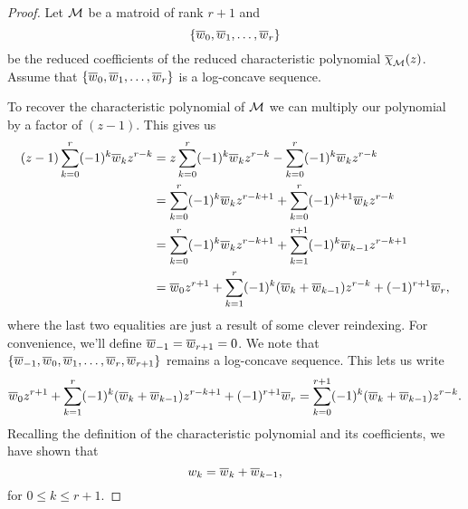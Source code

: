 \documentclass[12pt,oneside]{../../sfsuthesis}
\begin{document}
\begin{proof}

    Let \( \mathcal{M} \) be a matroid of rank \( r + 1 \) and
    \[
        \{\overline{w}_0, \overline{w}_1, \dots, \overline{w}_r \}
    \]
    be the reduced coefficients of the reduced characteristic polynomial \( \overline{\chi}_{\mathcal{M}}(z) \).
    Assume that \( \{\overline{w}_0, \overline{w}_1, \dots, \overline{w}_r \} \) is a log-concave sequence.

    To recover the characteristic polynomial of \( \mathcal{M} \) we can multiply our polynomial by a factor of \( (z-1) \).
    This gives us
    \begin{align*}
        (z - 1)\sum_{k=0}^r(-1)^k \overline{w}_k z^{r-k} & = z\sum_{k=0}^r(-1)^k \overline{w}_k z^{r-k} - \sum_{k=0}^r(-1)^k \overline{w}_k z^{r-k}              \\
                                                & = \sum_{k=0}^r(-1)^k \overline{w}_k z^{r-k+1} + \sum_{k=0}^r(-1)^{k+1} \overline{w}_k z^{r-k}         \\
                                                & = \sum_{k=0}^r(-1)^k \overline{w}_k z^{r-k+1} + \sum_{k=1}^{r+1}(-1)^{k} \overline{w}_{k-1} z^{r-k+1} \\
                                                & = \overline{w}_0 z^{r+1} + \sum_{k=1}^r (-1)^k (\overline{w}_k + \overline{w}_{k-1})z^{r-k} + (-1)^{r+1}\overline{w}_r,
    \end{align*}
    where the last two equalities are just a result of some clever reindexing.
    For convenience, we'll define \( \overline{w}_{-1} = \overline{w}_{r+1} = 0 \).
    We note that \( \{ \overline{w}_{-1}, \overline{w}_0, \overline{w}_1, \dots, \overline{w}_r, \overline{w}_{r+1} \} \) remains a log-concave sequence.
    This lets us write
    \[
        \overline{w}_0 z^{r+1} + \sum_{k=1}^r (-1)^k (\overline{w}_k + \overline{w}_{k-1})z^{r-k+1} + (-1)^{r+1}\overline{w}_r = \sum_{k=0}^{r+1}(-1)^k(\overline{w}_k + \overline{w}_{k-1})z^{r-k}.
    \]
    Recalling the definition of the characteristic polynomial and its coefficients, we have shown that
    \[
        w_k = \overline{w}_k + \overline{w}_{k-1},
    \]
    for \( 0 \leq k \leq r+1 \).


\end{proof}
\end{document}

